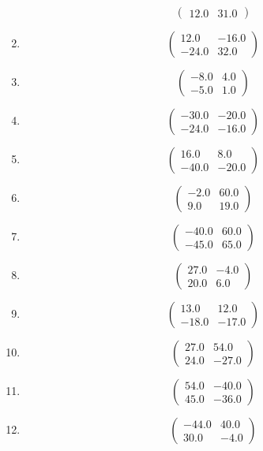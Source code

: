 \documentclass{article}%
\begin{document}
\begin{enumerate}[label=\arabic*)]
\[\begin{pmatrix}
12.0&31.0%
\end{pmatrix}%
\]%
\item%
\[%
\begin{pmatrix}%
12.0&-16.0\\%
-24.0&32.0%
\end{pmatrix}%
\]%
\item%
\[%
\begin{pmatrix}%
-8.0&4.0\\%
-5.0&1.0%
\end{pmatrix}%
\]%
\item%
\[%
\begin{pmatrix}%
-30.0&-20.0\\%
-24.0&-16.0%
\end{pmatrix}%
\]%
\item%
\[%
\begin{pmatrix}%
16.0&8.0\\%
-40.0&-20.0%
\end{pmatrix}%
\]%
\item%
\[%
\begin{pmatrix}%
-2.0&60.0\\%
9.0&19.0%
\end{pmatrix}%
\]%
\item%
\[%
\begin{pmatrix}%
-40.0&60.0\\%
-45.0&65.0%
\end{pmatrix}%
\]%
\item%
\[%
\begin{pmatrix}%
27.0&-4.0\\%
20.0&6.0%
\end{pmatrix}%
\]%
\item%
\[%
\begin{pmatrix}%
13.0&12.0\\%
-18.0&-17.0%
\end{pmatrix}%
\]%
\item%
\[%
\begin{pmatrix}%
27.0&54.0\\%
24.0&-27.0%
\end{pmatrix}%
\]%
\item%
\[%
\begin{pmatrix}%
54.0&-40.0\\%
45.0&-36.0%
\end{pmatrix}%
\]%
\item%
\[%
\begin{pmatrix}%
-44.0&40.0\\%
30.0&-4.0%
\end{pmatrix}%
\]
\end{enumerate}
\end{document}
